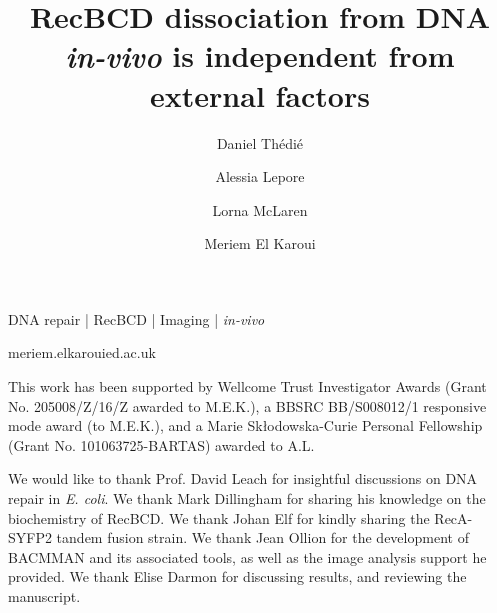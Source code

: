 \documentclass[times, twoside]{zHenriquesLab-StyleBioRxiv}
\begin{document}
\title{RecBCD dissociation from DNA \emph{in-vivo} is independent from external factors}
\shorttitle{}

\author[1]{Daniel Thédié}
\author[2]{Alessia Lepore}
\author[1]{Lorna McLaren}
\author[1,3]{Meriem El Karoui}


\affil[3]{}  %

\maketitle

\begin{abstract}

\end{abstract}

\begin{keywords}
    DNA repair | RecBCD | Imaging | \emph{in-vivo}
\end{keywords}

\begin{corrauthor}
    meriem.elkaroui\at ed.ac.uk
\end{corrauthor}









\begin{funding}
    This work has been supported by Wellcome Trust Investigator Awards (Grant No. 205008/Z/16/Z awarded to M.E.K.), a BBSRC BB/S008012/1 responsive mode award (to M.E.K.), and a Marie Skłodowska-Curie Personal Fellowship (Grant No. 101063725-BARTAS) awarded to A.L.
\end{funding}

\begin{acknowledgements}
    We would like to thank Prof. David Leach for insightful discussions on DNA repair in \emph{E. coli}. We thank Mark Dillingham for sharing his knowledge on the biochemistry of RecBCD. We thank Johan Elf for kindly sharing the RecA-SYFP2 tandem fusion strain. We thank Jean Ollion for the development of BACMMAN and its associated tools, as well as the image analysis support he provided. We thank Elise Darmon for discussing results, and reviewing the manuscript.
\end{acknowledgements}
\end{document}
